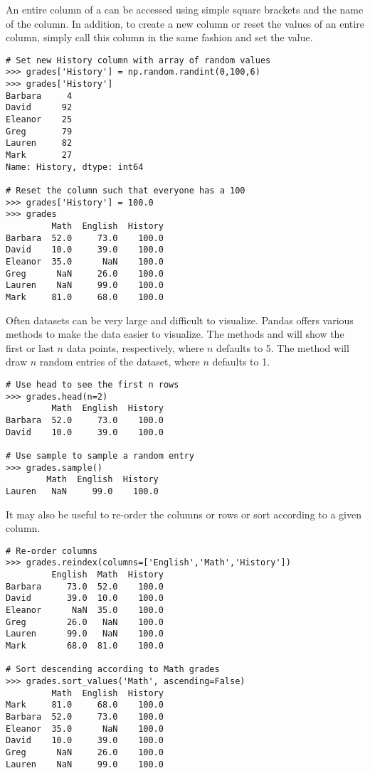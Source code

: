 An entire column of a  can be accessed using simple square
brackets and the name of the column.
In addition, to create a new column or reset the values of an entire column, simply call this column in the same fashion and set the value.

\begin{lstlisting}
# Set new History column with array of random values
>>> grades['History'] = np.random.randint(0,100,6)
>>> grades['History']
Barbara     4
David      92
Eleanor    25
Greg       79
Lauren     82
Mark       27
Name: History, dtype: int64

# Reset the column such that everyone has a 100
>>> grades['History'] = 100.0
>>> grades
         Math  English  History
Barbara  52.0     73.0    100.0
David    10.0     39.0    100.0
Eleanor  35.0      NaN    100.0
Greg      NaN     26.0    100.0
Lauren    NaN     99.0    100.0
Mark     81.0     68.0    100.0
\end{lstlisting}


Often datasets can be very large and difficult to visualize.
Pandas offers various methods to make the data easier to visualize.
The methods  and  will show the first or last $n$ data points, respectively, where $n$ defaults to 5.
The method  will draw $n$ random entries of the dataset, where $n$ defaults to 1.

\begin{lstlisting}
# Use head to see the first n rows
>>> grades.head(n=2)
         Math  English  History
Barbara  52.0     73.0    100.0
David    10.0     39.0    100.0

# Use sample to sample a random entry
>>> grades.sample()
        Math  English  History
Lauren   NaN     99.0    100.0
\end{lstlisting}

It may also be useful to re-order the columns or rows or sort according to a
given column.

\begin{lstlisting}
# Re-order columns
>>> grades.reindex(columns=['English','Math','History'])
         English  Math  History
Barbara     73.0  52.0    100.0
David       39.0  10.0    100.0
Eleanor      NaN  35.0    100.0
Greg        26.0   NaN    100.0
Lauren      99.0   NaN    100.0
Mark        68.0  81.0    100.0

# Sort descending according to Math grades
>>> grades.sort_values('Math', ascending=False)
         Math  English  History
Mark     81.0     68.0    100.0
Barbara  52.0     73.0    100.0
Eleanor  35.0      NaN    100.0
David    10.0     39.0    100.0
Greg      NaN     26.0    100.0
Lauren    NaN     99.0    100.0
\end{lstlisting}

